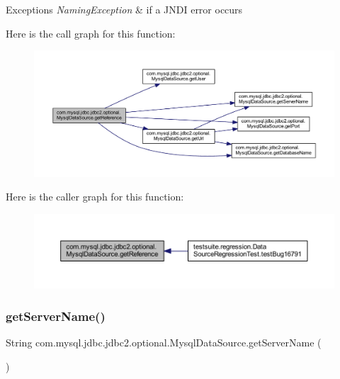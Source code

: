 \begin{DoxyExceptions}{Exceptions}
{\em Naming\+Exception} & if a J\+N\+DI error occurs \\
\hline
\end{DoxyExceptions}
Here is the call graph for this function\+:
\nopagebreak
\begin{figure}[H]
\begin{center}
\leavevmode
\includegraphics[width=350pt]{classcom_1_1mysql_1_1jdbc_1_1jdbc2_1_1optional_1_1_mysql_data_source_a75a3ebb597b5c7d7ab881e9253470ef8_cgraph}
\end{center}
\end{figure}
Here is the caller graph for this function\+:
\nopagebreak
\begin{figure}[H]
\begin{center}
\leavevmode
\includegraphics[width=350pt]{classcom_1_1mysql_1_1jdbc_1_1jdbc2_1_1optional_1_1_mysql_data_source_a75a3ebb597b5c7d7ab881e9253470ef8_icgraph}
\end{center}
\end{figure}
\mbox{\label{classcom_1_1mysql_1_1jdbc_1_1jdbc2_1_1optional_1_1_mysql_data_source_a91c1773084dd32d26ff498f5efac43ef}} 
\subsubsection{\texorpdfstring{get\+Server\+Name()}{getServerName()}}
{\footnotesize\ttfamily String com.\+mysql.\+jdbc.\+jdbc2.\+optional.\+Mysql\+Data\+Source.\+get\+Server\+Name (\begin{DoxyParamCaption}{ }\end{DoxyParamCaption})}

